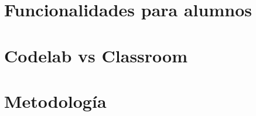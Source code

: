 \section{Funcionalidades para alumnos}
\label{:sec6}


\section{Codelab vs Classroom}
\label{:sec7}


\section{Metodología}
\label{:sec8}

